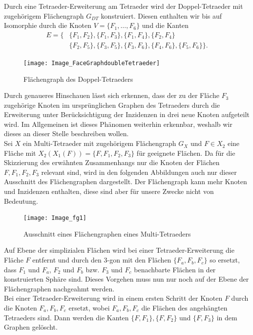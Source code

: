 \documentclass[12pt,titlepage,twoside,cleardoublepage]{article}
\theoremstyle{nummermitklammern}
\numberwithin{equation}{section}
\begin{document}
Durch eine Tetraeder-Erweiterung am Tetraeder wird der Doppel-Tetraeder mit zugehörigem Flächengraph $G_{DT}$ konstruiert. Diesen enthalten wir bis auf Isomorphie durch die Knoten $V=\{F_1,\ldots,F_6\}$ und die Kanten 
\begin{align*}
E=\{&\{F_1,F_2\},\{F_1,F_3\},\{F_1,F_4\},\{F_2,F_4\}\\
&\{F_2,F_5\},\{F_3,F_5\},\{F_3,F_6\},\{F_4,F_6\},\{F_5,F_6\}\}.
\end{align*}
\begin{figure}[H]
\begin{center}
\texttt{[image: Image\_FaceGraphdoubleTetraeder]}
\end{center}
\caption{Flächengraph des Doppel-Tetraeders}
\end{figure}
Durch genaueres Hinschauen lässt sich erkennen, dass der zu der Fläche $F_3$ zugehörige Knoten im ursprünglichen Graphen des Tetraeders durch die Erweiterung unter Berücksichtigung der Inzidenzen in drei neue Knoten aufgeteilt wird. Im Allgemeinen ist dieses Phänomen weiterhin erkennbar, weshalb wir dieses an dieser Stelle beschreiben wollen.\\
Sei $X$ ein Multi-Tetraeder mit zugehörigem Flächengraph $G_X$ und $F\in X_2$ eine Fläche mit $X_2(X_1(F))=\{F,F_1,F_2,F_3\}$ für geeignete Flächen. 
Da für die Skizzierung des erwähnten Zusammenhangs nur die Knoten der Flächen $F,F_1,F_2,F_3$ relevant sind, wird in den folgenden Abbildungen auch nur dieser Ausschnitt des Flächengraphen dargestellt. Der Flächengraph kann mehr Knoten und Inzidenzen enthalten, diese sind aber für unsere Zwecke nicht von Bedeutung.
\begin{figure}[H]
\begin{center}
\texttt{[image: Image\_fg1]}
\end{center}
\caption{Ausschnitt eines Flächengraphen eines Multi-Tetraeders}
\end{figure}
Auf Ebene der simplizialen Flächen wird bei einer Tetraeder-Erweiterung die Fläche $F$ entfernt und durch den 3-gon mit den Flächen $\{F_a,F_b,F_c\}$ so ersetzt, dass $F_1$ und $F_a$, $F_2$ und $F_b$ bzw. $F_3$ und $F_c$ benachbarte Flächen in der konstruierten Sphäre sind. Dieses Vorgehen muss nun nur noch auf der Ebene der Flächengraphen nachgeahmt werden.\\
Bei einer Tetraeder-Erweiterung wird in einem ersten Schritt der Knoten $F$ durch die Knoten $F_a,F_b,F_c$ ersetzt, wobei $F_a,F_b,F_c$ die Flächen des angehängten Tetraeders sind. Dann werden die Kanten $\{F,F_1\},\{F,F_2\}$ und $\{F,F_3\}$ in dem Graphen gelöscht.
\end{document}
